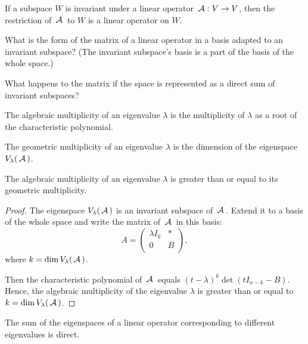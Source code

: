 \begin{exercise}
    If a subspace $W$ is invariant under a linear operator $\,\mathcal{A}\,\colon V \to V$, then the restriction of $\,\mathcal{A}\,$ to $W$ is a linear operator on $W$.
\end{exercise}

\begin{exercise}
    What is the form of the matrix of a linear operator in a basis adapted to an invariant subspace? (The invariant subspace's basis is a part of the basis of the whole space.)
\end{exercise}

\begin{exercise}
    What happens to the matrix if the space is represented as a direct sum of invariant subspaces?
\end{exercise}

\begin{definition}
The algebraic multiplicity of an eigenvalue $\lambda$ is the multiplicity of $\lambda$ as a root of the characteristic polynomial.
\end{definition}

\begin{definition}
The geometric multiplicity of an eigenvalue $\lambda$ is the dimension of the eigenspace $V_{\lambda}(\,\mathcal{A}\,)$.
\end{definition}

\begin{lemma}
The algebraic multiplicity of an eigenvalue $\lambda$ is greater than or equal to its geometric multiplicity.
\end{lemma}

\begin{proof}
The eigenspace $V_{\lambda}(\,\mathcal{A}\,)$ is an invariant subspace of $\,\mathcal{A}\,$. Extend it to a basis of the whole space and write the matrix of $\,\mathcal{A}\,$ in this basis:
$$
A = \begin{pmatrix}
\lambda I_k & * \\
0 & B \\
\end{pmatrix},
$$
where $k = \dim V_{\lambda}(\,\mathcal{A}\,)$.

Then the characteristic polynomial of $\,\mathcal{A}\,$ equals $(t - \lambda)^k \det(t I_{n - k} - B)$. Hence, the algebraic multiplicity of the eigenvalue $\lambda$ is greater than or equal to $k = \dim V_{\lambda}(\,\mathcal{A}\,)$.
\end{proof}

\begin{lemma}
The sum of the eigenspaces of a linear operator corresponding to different eigenvalues is direct.
\end{lemma}

